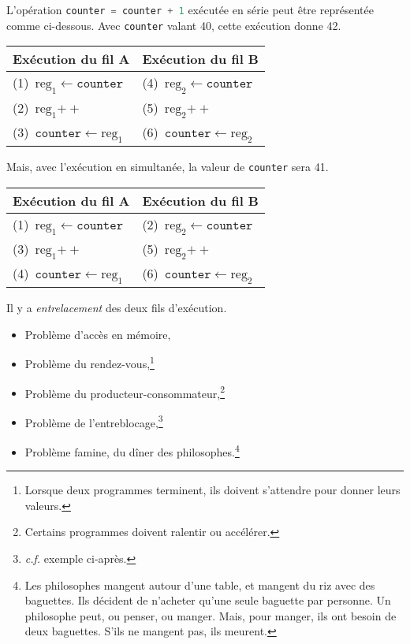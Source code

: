 \begin{exm}
	L'opération \lstinline[language=c]-counter = counter + 1- exécutée en série peut être représentée comme ci-dessous. Avec \texttt{counter} valant 40, cette exécution donne 42.
	\begin{table}[H]
		\centering
		\begin{tabular}{l|l}
			Exécution du fil A & Exécution du fil B\\ \hline
			(1)~$\mathrm{reg}_1 \gets \texttt{counter}$ & (4)~$\mathrm{reg}_2 \gets \texttt{counter}$ \\
			(2)~$\mathrm{reg}_1{++}$ & (5)~$\mathrm{reg}_2{++}$ \\
			(3)~$\texttt{counter} \gets \mathrm{reg}_1$ & (6)~$\texttt{counter} \gets \mathrm{reg}_2$
		\end{tabular}
	\end{table}
	\noindent Mais, avec l'exécution en simultanée, la valeur de \texttt{counter} sera 41.
	\begin{table}[H]
		\centering
		\begin{tabular}{l|l}
			Exécution du fil A & Exécution du fil B\\ \hline
			(1)~$\mathrm{reg}_1 \gets \texttt{counter}$ & (2)~$\mathrm{reg}_2 \gets \texttt{counter}$ \\
			(3)~$\mathrm{reg}_1{++}$ & (5)~$\mathrm{reg}_2{++}$ \\
			(4)~$\texttt{counter} \gets \mathrm{reg}_1$ & (6)~$\texttt{counter} \gets \mathrm{reg}_2$
		\end{tabular}
	\end{table}
	\noindent Il y a \textit{entrelacement} des deux fils d'exécution.
\end{exm}

\begin{rmk}
	\begin{itemize}
		\item Problème d'accès en mémoire,
		\item Problème du rendez-vous,\footnote{Lorsque deux programmes terminent, ils doivent s'attendre pour donner leurs valeurs.}
		\item Problème du producteur-consommateur,\footnote{Certains programmes doivent ralentir ou accélérer.}
		\item Problème de l'entreblocage,\footnote{\textit{c.f.} exemple ci-après.}
		\item Problème famine, du dîner des philosophes.\footnote{Les philosophes mangent autour d'une table, et mangent du riz avec des baguettes. Ils décident de n'acheter qu'une seule baguette par personne. Un philosophe peut, ou penser, ou manger. Mais, pour manger, ils ont besoin de deux baguettes. S'ils ne mangent pas, ils meurent.}
	\end{itemize}
\end{rmk}

